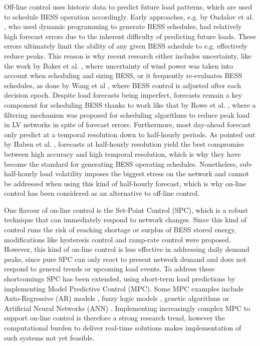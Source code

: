 Off-line control uses historic data to predict future load patterns, which are used to schedule BESS operation accordingly.
Early approaches, e.g. by Oudalov et al. \cite{Oudalov2007}, who used dynamic programming to generate BESS schedules, had relatively high forecast errors due to the inherent difficulty of predicting future loads.
These errors ultimately limit the ability of any given BESS schedule to e.g. effectively reduce peaks.
This reason is why recent research either includes uncertainty, like the work by Baker et al. \cite{Baker2017}, where uncertainty of wind power was taken into account when scheduling and sizing BESS, or it frequently re-evaluates BESS schedules, as done by Wang et al \cite{Wang2014a}, where BESS control is adjusted after each decision epoch.
Despite load forecasts being imperfect, forecasts remain a key component for scheduling BESS thanks to work like that by Rowe et al. \cite{Rowe2014a}, where a filtering mechanism was proposed for scheduling algorithms to reduce peak load in LV networks in spite of forecast errors.
Furthermore, most day-ahead forecast only predict at a temporal resolution down to half-hourly periods.
As pointed out by Haben et al. \cite{Poghosyan2014, Haben2014}, forecasts at half-hourly resolution yield the best compromise between high accuracy and high temporal resolution, which is why they have become the standard for generating BESS operating schedules.
Nonetheless, sub-half-hourly load volatility imposes the biggest stress on the network and cannot be addressed when using this kind of half-hourly forecast, which is why on-line control has been considered as an alternative to off-line control.

One flavour of on-line control is the Set-Point Control (SPC), which is a robust technique that can immediately respond to network changes.
Since this kind of control runs the risk of reaching shortage or surplus of BESS stored energy, modifications like hysteresis control \cite{Gybel2012} and ramp-rate control \cite{Such2012} were proposed.
However, this kind of on-line control is less effective in addressing daily demand peaks, since pure SPC can only react to present network demand and does not respond to general trends or upcoming load events.
To address these shortcomings SPC has been extended, using short-term load predictions by implementing Model Predictive Control (MPC).
Some MPC examples include Auto-Regressive (AR) models \cite{Li2009, Nie2011}, fuzzy logic models \cite{Sannomiya2001, Chen2013a}, genetic algorithms \cite{Xia2015a, Liu2015} or Artificial Neural Networks (ANN) \cite{Kalogirou2014, Quan2014, Lee2014, Pezeshki2014, Vaz2016, Reihani2016, Xiao2017}.
Implementing increasingly complex MPC to support on-line control is therefore a strong research trend, however the computational burden to deliver real-time solutions makes implementation of such systems not yet feasible.

